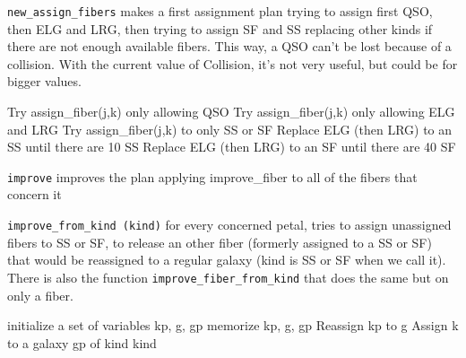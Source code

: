\documentclass{extarticle}
\begin{document}
{\tt new\_assign\_fibers} makes a first assignment plan trying to assign first QSO, then ELG and LRG, then trying to assign SF and SS replacing other kinds if there are not enough available fibers. This way, a QSO can't be lost because of a collision. With the current value of Collision, it's not very useful, but could be for bigger values.

\begin{algorithm}[H]
	\caption{New\_assign\_fibers(j0,n)}\label{euclid}
	\begin{algorithmic}[1]
		\State Try assign\_fiber(j,k) only allowing QSO
		\EndFor
		\State Try assign\_fiber(j,k) only allowing ELG and LRG
		\EndFor
		\State Try assign\_fiber(j,k) to only SS or SF
		\EndFor
		\State Replace ELG (then LRG) to an SS until there are 10 SS
		\EndIf
		\State Replace ELG (then LRG) to an SF until there are 40 SF
		\EndIf
		\EndFor
		\EndFor
	\end{algorithmic}
\end{algorithm}

{\tt improve} improves the plan applying improve\_fiber to all of the fibers that concern it

{\tt improve\_from\_kind (kind)} for every concerned petal, tries to assign unassigned fibers to SS or SF, to release an other fiber (formerly assigned to a SS or SF) that would be reassigned to a regular galaxy (kind is SS or SF when we call it). There is also the function {\tt improve\_fiber\_from\_kind} that does the same but on only a fiber.

\begin{algorithm}[H]
	\caption{Improve\_from\_kind (kind,j0,n)}\label{euclid}
	\begin{algorithmic}[1]
		\State initialize a set of variables kp, g, gp
		\State memorize kp, g, gp
		\EndIf
		\EndFor
		\EndFor
		\State Reassign kp to g
		\State Assign k to a galaxy gp of kind kind
		\EndIf
		\EndFor
		\EndFor
		\EndFor
	\end{algorithmic}
\end{algorithm}
\end{document}
